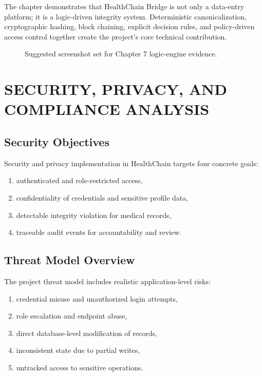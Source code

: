\documentclass[12pt,a4paper]{report}
\begin{document}
The chapter demonstrates that HealthChain Bridge is not only a data-entry platform; it is a logic-driven integrity system. Deterministic canonicalization, cryptographic hashing, block chaining, explicit decision rules, and policy-driven access control together create the project's core technical contribution.

\begin{figure}[H]
\centering
{}
\caption{Suggested screenshot set for Chapter 7 logic-engine evidence.}
\label{fig:placeholder-logic-evidence}
\end{figure}

\chapter{SECURITY, PRIVACY, AND COMPLIANCE ANALYSIS}

\section{Security Objectives}

Security and privacy implementation in HealthChain targets four concrete goals:

\begin{enumerate}
\item authenticated and role-restricted access,
\item confidentiality of credentials and sensitive profile data,
\item detectable integrity violation for medical records,
\item traceable audit events for accountability and review.
\end{enumerate}

\section{Threat Model Overview}

The project threat model includes realistic application-level risks:

\begin{enumerate}
\item credential misuse and unauthorized login attempts,
\item role escalation and endpoint abuse,
\item direct database-level modification of records,
\item inconsistent state due to partial writes,
\item untracked access to sensitive operations.
\end{enumerate}
\end{document}

